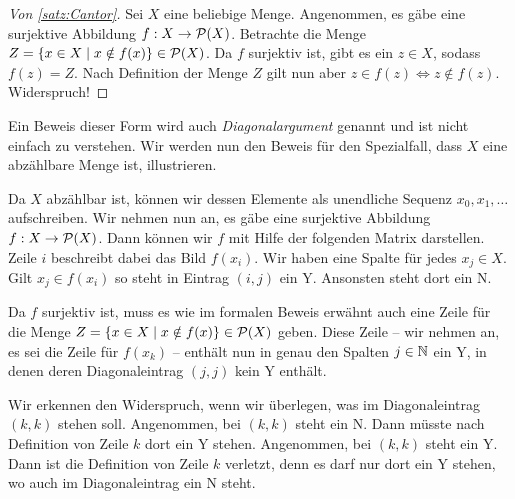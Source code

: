 \begin{proof}[Von \autoref{satz:Cantor}]
Sei $X$ eine beliebige Menge.
Angenommen, es gäbe eine surjektive Abbildung $f:X\rightarrow\mathcal{P}(X)$.
Betrachte die Menge $Z=\{x\in X\mid x\notin f(x)\}\in\mathcal{P}(X)$.
Da $f$ surjektiv ist, gibt es ein $z\in X$, sodass $f(z)=Z$.
Nach Definition der Menge $Z$ gilt nun aber $z\in f(z)\Leftrightarrow z\notin f(z)$. Widerspruch!
\end{proof}

Ein Beweis dieser Form wird auch \emph{Diagonalargument} genannt und ist nicht einfach zu verstehen.
Wir werden nun den Beweis für den Spezialfall, dass $X$ eine abzählbare Menge ist, illustrieren.

Da $X$ abzählbar ist, können wir dessen Elemente als unendliche Sequenz $x_0,x_1,\ldots$ aufschreiben.
Wir nehmen nun an, es gäbe eine surjektive Abbildung $f:X\rightarrow\mathcal{P}(X)$.
Dann können wir $f$ mit Hilfe der folgenden Matrix darstellen.
Zeile $i$ beschreibt dabei das Bild $f(x_i)$. 
Wir haben eine Spalte für jedes $x_j\in X$.
Gilt $x_j\in f(x_i)$ so steht in Eintrag $(i,j)$ ein Y. Ansonsten steht dort ein N.

Da $f$ surjektiv ist, muss es wie im formalen Beweis erwähnt auch eine Zeile für die Menge $Z=\{x\in X\mid x\notin f(x)\}\in\mathcal{P}(X)$ geben.
Diese Zeile -- wir nehmen an, es sei die Zeile für $f(x_k)$ -- enthält nun in genau den Spalten $j\in\mathbb{N}$ ein Y, in denen deren Diagonaleintrag $(j, j)$ kein Y enthält.

Wir erkennen den Widerspruch, wenn wir überlegen, was im Diagonaleintrag $(k, k)$ stehen soll.
Angenommen, bei $(k, k)$ steht ein N.
Dann müsste nach Definition von Zeile $k$ dort ein Y stehen.
Angenommen, bei $(k, k)$ steht ein Y.
Dann ist die Definition von Zeile $k$ verletzt, denn es darf nur dort ein Y stehen, wo auch im Diagonaleintrag ein N steht.

